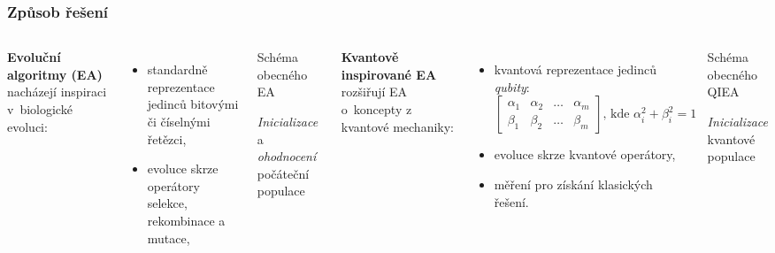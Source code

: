 \begin{frame}
  \frametitle{Způsob řešení}
  \begin{columns}
    \small
    \textbf{Evoluční algoritmy (EA)} nacházejí inspiraci v~biologické evoluci:
      \begin{itemize}      
        \item standardně reprezentace jedinců bitovými či číselnými řetězci,
        \item evoluce skrze operátory selekce, rekombinace a mutace,
      \end{itemize}

    \vspace{3.5em}

    \begin{block}{}
    \IncMargin{1em}
    \begin{algorithm}[H]
      \scriptsize
      \SetAlCapFnt{\scriptsize}
      \SetAlCapNameFnt{\scriptsize}
      \caption{Schéma obecného EA}
      \SetAlgoLined
      \emph{Inicializace} a \emph{ohodnocení} počáteční populace\;
    \end{algorithm}
    \end{block}

    \small
    \textbf{Kvantově inspirované EA} rozšiřují EA o~koncepty z kvantové mechaniky:
    \begin{itemize}
        \item kvantová reprezentace jedinců \emph{qubity}:
        \begin{equation*}
          \begin{bmatrix}
            \alpha_1 & \alpha_2 & \dots & \alpha_m \\
            \beta_1  & \beta_2  & \dots & \beta_m
          \end{bmatrix}
          \text{, kde } \alpha^2_i + \beta^2_i = 1
        \end{equation*}
        \item evoluce skrze kvantové operátory,
        \item měření pro získání klasických řešení.
    \end{itemize}
    

    \begin{block}{}
    \IncMargin{1em}
    \begin{algorithm}[H]
      \scriptsize
      \SetAlCapFnt{\scriptsize}
      \SetAlCapNameFnt{\scriptsize}
      \caption{Schéma obecného QIEA}
      \SetAlgoLined
        \emph{Inicializace} kvantové populace\;
      \end{algorithm}
    \end{block}
  \end{columns}
\end{frame}



